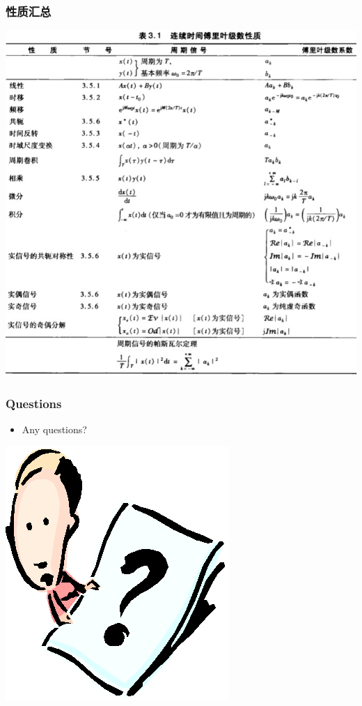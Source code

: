 \documentclass[CJKutf8,xcolor=pdftex,dvipsnames,table]{beamer}
\begin{document}
\begin{CJK*}{UTF8}{song}
  \begin{frame}
    \frametitle{性质汇总}
    \begin{center}
      \includegraphics[scale=.35]{ss-c-t3-1}
    \end{center}
  \end{frame}     
    
  \begin{frame}
    \frametitle{Questions}
    \begin{itemize}
    \item Any questions?
    \end{itemize}
    \begin{center}
      \includegraphics[scale=.5]{question}
    \end{center}
  \end{frame}  
    

\end{CJK*}
\end{document}
